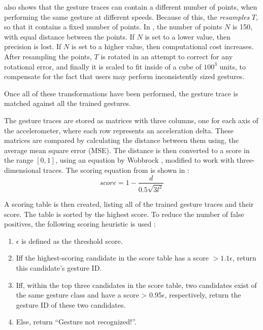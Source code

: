  also shows that the gesture traces can contain a different number of points, 
when performing the same gesture at different speeds.
Because of this, the \threedollar \emph{resamples} $T$, 
so that it contains a fixed number of points. 
In \cite{threedollar}, the number of points $N$ is \num{150}, 
with equal distance between the points.
If $N$ is set to a lower value, then precision is lost. 
If $N$ is set to a higher value, then computational cost increases.
After resampling the points, 
$T$ is rotated in an attempt to correct for any rotational error, 
and finally it is scaled to fit inside of a cube of $100^3$ units, 
to compensate for the fact that users may perform inconsistently sized gestures.


Once all of these transformations have been performed, 
the gesture trace is matched against all the trained gestures. 

The gesture traces are stored as matrices with three columns, 
one for each axis of the accelerometer, 
where each row represents an acceleration delta.
These matrices are compared by calculating the distance between them using, 
the average mean square error (MSE).
The distance is then converted to a score in the range $[0,1]$, 
using an equation by Wobbrock \etal, 
modified to work with three-dimensional traces.
The scoring equation from \cite{threedollar} is shown in :
\begin{equation}\label{eq:gesture-scoring}
    score = 1-\frac{d}{0.5\sqrt{3l^2}}
\end{equation}

A scoring table is then created, 
listing all of the trained gesture traces and their score. 
The table is sorted by the highest score.
To reduce the number of false positives, 
the following scoring heuristic is used \cite{threedollar}:

\begin{enumerate}
	\item {$\epsilon$ is defined as the threshold score.}
	\item {Iff the highest-scoring candidate in the score table has a score $> 1.1\epsilon$, return this candidate’s gesture ID.}
	\item {Iff, within the top three candidates in the score table, two candidates exist of the same gesture class and have a score > 0.95$\epsilon$, respectively, return the gesture ID of these two candidates.}
	\item {Else, return ``Gesture not recognized!''.}
\end{enumerate}

